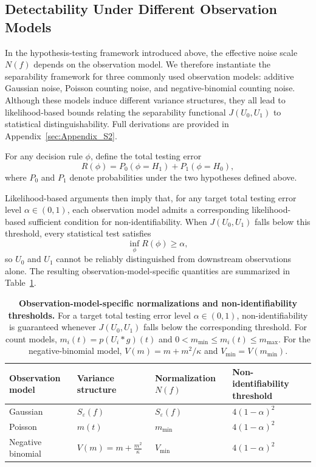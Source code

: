 \subsection*{Detectability Under Different Observation Models}

In the hypothesis-testing framework introduced above, the effective noise scale \(N(f)\) depends on the observation model. We therefore instantiate the separability framework for three commonly used observation models: additive Gaussian noise, Poisson counting noise, and negative-binomial counting noise. Although these models induce different variance structures, they all lead to likelihood-based bounds relating the separability functional \(J(U_0,U_1)\) to statistical distinguishability. Full derivations are provided in Appendix~\ref{sec:Appendix_S2}.

For any decision rule \(\phi\), define the total testing error
\[
R(\phi)
=
P_0(\phi=H_1)
+
P_1(\phi=H_0),
\]
where \(P_0\) and \(P_1\) denote probabilities under the two hypotheses defined above. 

Likelihood-based arguments then imply that, for any target total testing error level \(\alpha\in(0,1)\), each observation model admits a corresponding likelihood-based sufficient condition for non-identifiability. When \(J(U_0,U_1)\) falls below this threshold, every statistical test satisfies
\[
\inf_{\phi} R(\phi)
\ge
\alpha,
\]
so \(U_0\) and \(U_1\) cannot be reliably distinguished from downstream observations alone. The resulting observation-model-specific quantities are summarized in Table~\ref{tab:noise-models}.

\begin{table}[!t]
\centering
\caption{
\textbf{Observation-model-specific normalizations and non-identifiability thresholds.}
For a target total testing error level \(\alpha\in(0,1)\),
non-identifiability is guaranteed whenever \(J(U_0,U_1)\) falls below
the corresponding threshold. For count models,
\(m_i(t)=p(U_i*g)(t)\) and
\(0<m_{\min}\le m_i(t)\le m_{\max}\).
For the negative-binomial model,
\(V(m)=m+m^2/\kappa\) and \(V_{\min}=V(m_{\min})\).
}
\label{tab:noise-models}
\begin{tabular}{llll}
\hline
Observation model
&
Variance structure
&
Normalization \(N(f)\)
&
Non-identifiability threshold
\\
\hline

Gaussian
&
\(S_{\varepsilon}(f)\)
&
\(S_{\varepsilon}(f)\)
&
\(\displaystyle 4(1-\alpha)^2\)
\\[8pt]

Poisson
&
\(m(t)\)
&
\(m_{\min}\)
&
\(\displaystyle 4(1-\alpha)^2\)
\\[8pt]

Negative binomial
&
\(\displaystyle V(m)=m+\frac{m^2}{\kappa}\)
&
\(V_{\min}\)
&
\(\displaystyle 4(1-\alpha)^2\)
\\[8pt]

\hline
\end{tabular}
\end{table}